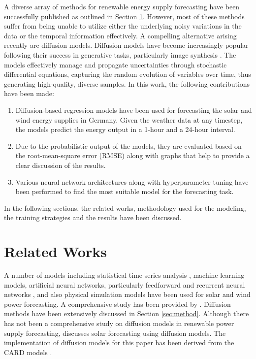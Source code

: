 \documentclass{article}
\begin{document}
A diverse array of methods for renewable energy supply forecasting have been successfully published as outlined in Section \ref{sec:related-works}. However, most of these methods suffer from being unable to utilize either the underlying noisy variations in the data or the temporal information effectively. A compelling alternative arising recently are diffusion models. Diffusion models have become increasingly popular following their success in generative tasks, particularly image synthesis \citep{dhariwal2021diffusion,ramesh2022hierarchical}. %
The models effectively manage and propagate uncertainties through stochastic differential equations, capturing the random evolution of variables over time, thus generating high-quality, diverse samples. In this work, the following contributions have been made:
\begin{enumerate}
  \item Diffusion-based regression models have been used for forecasting the solar and wind energy supplies in Germany. Given the weather data at any timestep, the models predict the energy output in a 1-hour and a 24-hour interval. %
  \item Due to the probabilistic output of the models, they are evaluated based on the root-mean-square error (RMSE) along with graphs that help to provide a clear discussion of the results.
  \item Various neural network architectures along with hyperparameter tuning have been performed to find the most suitable model for the forecasting task.
\end{enumerate}

In the following sections, the related works, methodology used for the modeling, the training strategies and the results have been discussed.

\section{Related Works} \label{sec:related-works}

A number of models including statistical time series analysis \citep{9209858}, machine learning models, artificial neural networks, particularly feedforward and recurrent neural networks \citep{hossain2020short, lim2022solar}, and also physical simulation models have been used for solar and wind power forecasting. A comprehensive study has been provided by \citet{tawn2022review}. Diffusion methods have been extensively discussed in Section \ref{sec:method}. Although there has not been a comprehensive study on diffusion models in renewable power supply forecasting, \citet{hatanaka2023diffusion} discusses solar forecasting using diffusion models. The implementation of diffusion models for this paper has been derived from the CARD models \citep{han2022card}.
\end{document}
